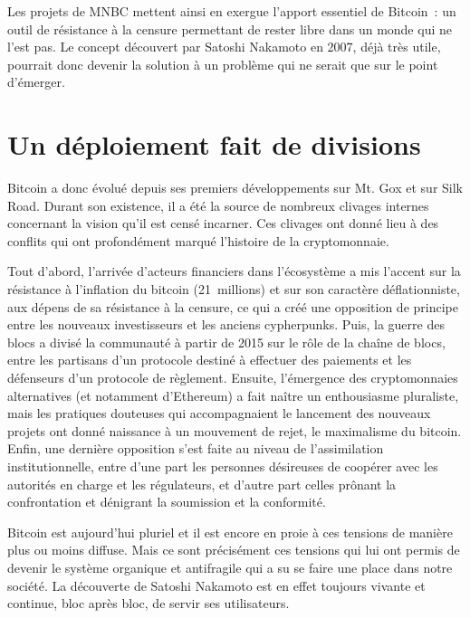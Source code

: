 Les projets de MNBC mettent ainsi en exergue l'apport essentiel de Bitcoin~: un outil de résistance à la censure permettant de rester libre dans un monde qui ne l'est pas. Le concept découvert par Satoshi Nakamoto en 2007, déjà très utile, pourrait donc devenir la solution à un problème qui ne serait que sur le point d'émerger.

\section*{Un déploiement fait de divisions}

Bitcoin a donc évolué depuis ses premiers développements sur Mt. Gox et sur Silk Road. Durant son existence, il a été la source de nombreux clivages internes concernant la vision qu'il est censé incarner. Ces clivages ont donné lieu à des conflits qui ont profondément marqué l'histoire de la cryptomonnaie.

Tout d'abord, l'arrivée d'acteurs financiers dans l'écosystème a mis l'accent sur la résistance à l'inflation du bitcoin (21~millions) et sur son caractère déflationniste, aux dépens de sa résistance à la censure, ce qui a créé une opposition de principe entre les nouveaux investisseurs et les anciens cypherpunks. Puis, la guerre des blocs a divisé la communauté à partir de 2015 sur le rôle de la chaîne de blocs, entre les partisans d'un protocole destiné à effectuer des paiements et les défenseurs d'un protocole de règlement. Ensuite, l'émergence des cryptomonnaies alternatives (et notamment d'Ethereum) a fait naître un enthousiasme pluraliste, mais les pratiques douteuses qui accompagnaient le lancement des nouveaux projets ont donné naissance à un mouvement de rejet, le maximalisme du bitcoin. Enfin, une dernière opposition s'est faite au niveau de l'assimilation institutionnelle, entre d'une part les personnes désireuses de coopérer avec les autorités en charge et les régulateurs, et d'autre part celles prônant la confrontation et dénigrant la soumission et la conformité.

Bitcoin est aujourd'hui pluriel et il est encore en proie à ces tensions de manière plus ou moins diffuse. Mais ce sont précisément ces tensions qui lui ont permis de devenir le système organique et antifragile qui a su se faire une place dans notre société. La découverte de Satoshi Nakamoto est en effet toujours vivante et continue, bloc après bloc, de servir ses utilisateurs.